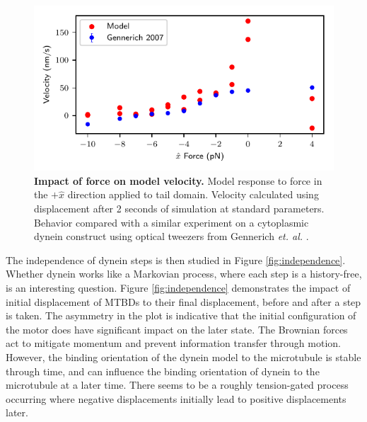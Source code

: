 \documentclass[9pt,twocolumn,twoside]{article}
\begin{document}
\begin{figure}[tbhp]
  \centering
  \includegraphics[width=\linewidth]{../../plots/paper_force_vs_velocity.pdf}
\caption{\textbf{Impact of force on model velocity.} Model response to force in the $+\hat{x}$ direction applied to tail domain. Velocity calculated using displacement after 2 seconds of simulation at standard parameters. Behavior compared with a similar experiment on a cytoplasmic dynein construct using optical tweezers from Gennerich \textit{et. al.} \cite{responsetoload}.}
\label{fig:force}
\end{figure}

The independence of dynein steps is then studied in Figure \ref{fig:independence}. Whether dynein works like a Markovian process, where each step is a history-free, is an interesting question. Figure \ref{fig:independence} demonstrates the impact of initial displacement of MTBDs to their final displacement, before and after a step is taken. The asymmetry in the plot is indicative that the initial configuration of the motor does have significant impact on the later state. The Brownian forces act to mitigate momentum and prevent information transfer through motion. However, the binding orientation of the dynein model to the microtubule is stable through time, and can influence the binding orientation of dynein to the microtubule at a later time. There seems to be a roughly tension-gated process occurring where negative displacements initially lead to positive displacements later.
\end{document}

